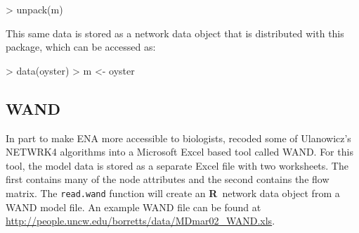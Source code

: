 \documentclass[article]{jss}
\newcommand{\R}{\textbf{R}}
\begin{document}
\begin{Schunk}
\begin{Sinput}
> unpack(m)
\end{Sinput}
\end{Schunk}

This same data is stored as a network data object that is distributed
with this package, which can be accessed as:
\begin{Schunk}
\begin{Sinput}
> data(oyster)
> m <- oyster
\end{Sinput}
\end{Schunk}

\subsection*{WAND}
In part to make ENA more accessible to biologists,
\citet{allesina04_wand} recoded some of Ulanowicz's NETWRK4 algorithms
into a Microsoft Excel based tool called WAND.  For this tool, the
model data is stored as a separate Excel file with two worksheets.
The first contains many of the node attributes and the second contains the
flow matrix.  The \texttt{read.wand} function will create an \R\
network data object from a WAND model file. An example WAND file can
be found at \url{http://people.uncw.edu/borretts/data/MDmar02_WAND.xls}.
\end{document}

